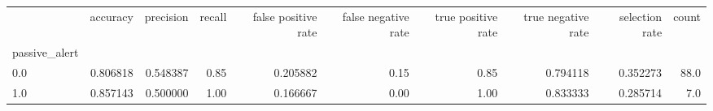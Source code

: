 \begin{tabular}{lrrrrrrrrr}
\toprule
{} &  accuracy &  precision &  recall &  false positive rate &  false negative rate &  true positive rate &  true negative rate &  selection rate &  count \\
passive\_alert &           &            &         &                      &                      &                     &                     &                 &        \\
\midrule
0.0           &  0.806818 &   0.548387 &    0.85 &             0.205882 &                 0.15 &                0.85 &            0.794118 &        0.352273 &   88.0 \\
1.0           &  0.857143 &   0.500000 &    1.00 &             0.166667 &                 0.00 &                1.00 &            0.833333 &        0.285714 &    7.0 \\
\bottomrule
\end{tabular}
